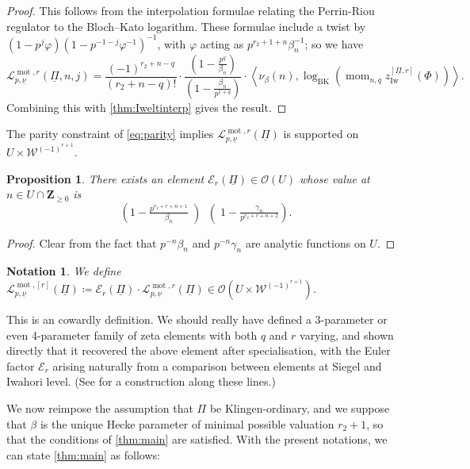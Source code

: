 \documentclass[cjm]{ipart}
\theoremstyle{plain}
\newtheorem{proposition}[theorem]{Proposition}
\newtheorem{notation}[theorem]{Notation}
\theoremstyle{remark}
\DeclareMathOperator{\Iw}{Iw}
\DeclareMathOperator{\mom}{mom}
\DeclareMathOperator{\mot}{mot}
\newcommand{\ZZ}{\mathbf{Z}}
\newcommand{\cE}{\mathcal{E}}
\newcommand{\cL}{\mathcal{L}}
\newcommand{\cO}{\mathcal{O}}
\newcommand{\cW}{\mathcal{W}}
\newcommand{\uPi}{\underline{\Pi}}
\newcommand{\unu}{\underline{\nu}}
\numberwithin{equation}{subsection}
\renewcommand{\ge}{\geqslant}
\begin{document}
  \begin{proof}
   This follows from the interpolation formulae relating the Perrin-Riou regulator to the Bloch--Kato logarithm. These formulae include a twist by $(1 - p^j \varphi)(1 - p^{-1-j} \varphi^{-1})^{-1}$, with $\varphi$ acting as $p^{r_2+1+n} \beta_n^{-1}$; so we have
   \[
    \cL^{\mot, r}_{p, \unu}(\uPi, n, j) = \frac{(-1)^{r_2 +n - q}}{(r_2 +n - q)!} \cdot \frac{\left(1 - \tfrac{p^q}{\beta_n}\right)}{\left(1 - \frac{\beta_n}{p^{1+q}}\right)} \cdot \left\langle \nu_\beta(n), \log_{\mathrm{BK}}\left(\mom_{n, q} z^{[\uPi, r]}_{\Iw}(\Phi)\right) \right\rangle.
   \]
   Combining this with \cref{thm:Iweltinterp} gives the result.
  \end{proof}

  \begin{note}
   The parity constraint of \cref{eq:parity} implies $\cL^{\mot, r}_{p, \unu}(\uPi)$ is supported on $U \times \cW^{(-1)^{r + 1}}$.
  \end{note}

  \begin{proposition}
   There exists an element $\mathcal{E}_r(\uPi) \in \cO(U)$ whose value at $n \in U \cap \ZZ_{\ge 0}$ is
   \[ \left(1 - \tfrac{p^{r_2 + r + n + 1}}{\beta_n}\middle)
   \middle(1 - \tfrac{\gamma_n}{p^{r_2 + r + n + 2}}\right).\]
  \end{proposition}

  \begin{proof}
   Clear from the fact that $p^{-n} \beta_n$ and $p^{-n}\gamma_n$ are analytic functions on $U$.
  \end{proof}

  \begin{notation}
   \label{not:Lpboxr}
   We define $\cL^{\mot, [r]}_{p, \unu}(\uPi) \coloneqq \cE_r(\uPi)\cdot \cL^{\mot, r}_{p, \unu}(\uPi) \in \cO(U \times \cW^{(-1)^{r + 1}})$.
  \end{notation}

  \begin{remark}
   This is an cowardly definition. We should really have defined a 3-parameter or even 4-parameter family of zeta elements with both $q$ and $r$ varying, and shown directly that it recovered the above element after specialisation, with the Euler factor $\cE_r$ arising naturally from a comparison between elements at Siegel and Iwahori level. (See \cite[\S 7.1]{LRZ} for a construction along these lines.)
  \end{remark}

  We now reimpose the assumption that $\Pi$ be Klingen-ordinary, and we suppose that $\beta$ is the unique Hecke parameter of minimal possible valuation $r_2 + 1$, so that the conditions of \cref{thm:main} are satisfied. With the present notations, we can state \cref{thm:main} as follows:
\end{document}
